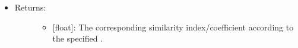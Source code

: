 \documentclass[letterpaper,10pt,english]{sphinxmanual}
\begin{document}
\begin{fulllineitems}
\begin{itemize}
\begin{description}
\begin{itemize}
\end{itemize}

\end{description}

\item {} \begin{description}
\item[{Returns:}] \leavevmode\begin{itemize}
\item {} 
{[}float{]}: The corresponding similarity index/coefficient
according to the specified .

\end{itemize}

\end{description}

\end{itemize}

\end{fulllineitems}

\end{document}
